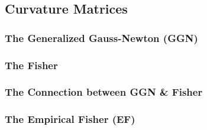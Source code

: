 \subsection{Curvature Matrices}
\subsubsection{The Generalized Gauss-Newton (GGN)}
\subsubsection{The Fisher}
\subsubsection{The Connection between GGN \& Fisher}
\subsubsection{The Empirical Fisher (EF)}

